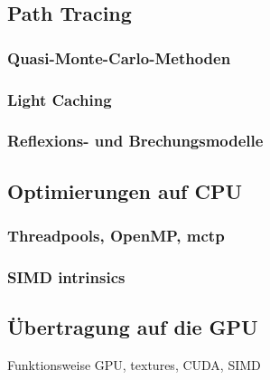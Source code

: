\documentclass[crop=false]{standalone}
\begin{document}

    \subsection{Path Tracing} %
    \label{sub:path_tracing}
      \subsubsection{Quasi-Monte-Carlo-Methoden} %
      \label{ssub:monte_carlo_methoden}


      \subsubsection{Light Caching} %
      \label{ssub:light_caching}


      \subsubsection{Reflexions- und Brechungsmodelle} %
      \label{ssub:reflexions_und_brechungsmodelle}


    \subsection{Optimierungen auf CPU} %
    \label{sub:optimierungen_auf_cpu}
      \subsubsection{Threadpools, OpenMP, mctp} %
      \label{ssub:threadpools}


      \subsubsection{SIMD intrinsics} %
      \label{ssub:simd_intrinsics}


    \subsection{Übertragung auf die GPU} %
    \label{sub:uebertragung_auf_die_gpu}
      Funktionsweise GPU, textures, CUDA, SIMD
\end{document}
